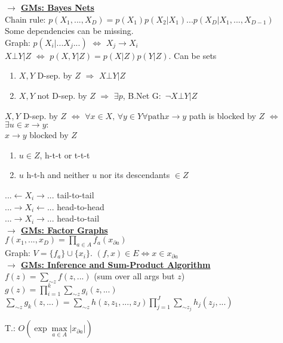 \documentclass[]{article}
\newcommand{\mytitle}[1]{ {\bf $\rightarrow$ \underline{#1}}\\}
\begin{document}
\begin{multicols*}{2}
\mytitle{GMs: Bayes Nets}
Chain rule: $p(X_1,...,X_D)=p(X_1)p(X_2|X_1)...p(X_D|X_1,...,X_{D-1})$\\
Some dependencies can be missing.\\
Graph: $p(X_i|...X_j...)$ $\Leftrightarrow$ $X_j\to X_i$\\
$X\bot Y|Z$ $\Leftrightarrow$ $p(X, Y|Z)=p(X|Z)p(Y|Z)$. Can be sets\\
\begin{enumerate}
	\item $X, Y$ D-sep. by $Z$ $\Rightarrow$ $X\bot Y|Z$
	\item $X, Y$ not D-sep. by $Z$ $\Rightarrow$ $\exists p$, B.Net G$\colon$ $\neg X\bot Y|Z$
\end{enumerate}
$X,Y$ D-sep. by $Z$ $\Leftrightarrow$ $\forall x\in X,\,\forall y\in Y \forall \mbox{path} x\to y$ path is blocked by $Z$ $\Leftrightarrow$ $\exists u\in x\to y\colon$\\
$x\to y$ blocked by $Z$
\begin{enumerate}
	\item $u\in Z$, h-t-t or t-t-t
	\item $u$ h-t-h and neither $u$ nor its descendants $\in Z$
\end{enumerate}
$...\leftarrow X_i\rightarrow...$ tail-to-tail\\
$...\rightarrow X_i\leftarrow...$ head-to-head\\
$...\rightarrow X_i\rightarrow...$ head-to-tail\\
\mytitle{GMs: Factor Graphs}
$f(x_1,...,x_D)=\prod\limits_{a\in A}f_a(x_{\partial a})$\\
Graph: $V=\{f_a\}\cup\{x_i\}$. $(f,x)\in E\Leftrightarrow x\in x_{\partial a}$\\

\mytitle{GMs: Inference and Sum-Product Algorithm}
$f(z)=\sum\limits_{\sim z}f(z,...)$ (sum over all args but $z$)\\
$g(z)=\prod\limits_{i=1}^k\sum\limits_{\sim z}g_i(z,...)$\\
$\sum\limits_{\sim z}g_k(z,...)=\sum\limits_{\sim z}h(z,z_1,...,z_J)\prod\limits_{j=1}^J\sum\limits_{\sim z_j}h_j(z_j,...)$

T.: $O\left(\exp \max\limits_{a\in A}|x_{\partial a}|\right)$
\end{multicols*}
\end{document}
